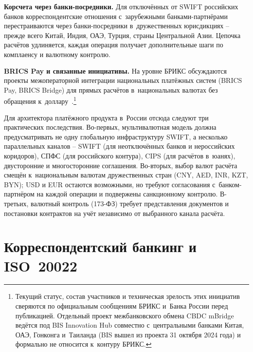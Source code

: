 \textbf{Корсчета через банки-посредники.} Для отключённых
от SWIFT российских банков корреспондентские отношения
с~зарубежными банками-партнёрами перестраиваются через
банки-посредники в~дружественных юрисдикциях -- прежде всего
Китай, Индия, ОАЭ, Турция, страны Центральной Азии. Цепочка
расчётов удлиняется, каждая операция получает дополнительные
шаги по комплаенсу и валютному контролю.

\textbf{BRICS Pay и связанные инициативы.} На уровне
БРИКС обсуждаются проекты межоператорной интеграции
национальных платёжных систем (BRICS Pay, BRICS Bridge)
для прямых расчётов в~национальных валютах без обращения
к~доллару~\cite{brics-pay-overview}.\footnote{Текущий статус,
состав участников и техническая зрелость этих инициатив
сверяются по официальным сообщениям БРИКС и~Банка России перед
публикацией. Отдельный проект межбанковского обмена
CBDC mBridge ведётся под BIS Innovation Hub совместно
с~центральными банками Китая, ОАЭ, Гонконга и~Таиланда
(BIS вышел из проекта 31 октября 2024 года) и формально
не относится к~контуру БРИКС.}

Для архитектора платёжного продукта в~России отсюда
следуют три практических последствия. Во-первых, мультивалютная
модель должна предусматривать не одну глобальную инфраструктуру
SWIFT, а несколько параллельных каналов -- SWIFT (для
неотключённых банков и нероссийских коридоров), СПФС
(для российского контура), CIPS (для расчётов в~юанях),
двусторонние и многосторонние соглашения. Во-вторых,
выбор валют расчёта смещён к~национальным валютам
дружественных стран (CNY, AED, INR, KZT, BYN); USD и EUR
остаются возможными, но требуют согласования с~банком-партнёром
на каждой операции и подвержены санкционному контролю.
В-третьих, валютный контроль (173-ФЗ) требует представления
документов и постановки контрактов на учёт независимо
от выбранного канала расчёта.


\section{Корреспондентский банкинг и ISO~20022}\label{sec:mc-correspondent}

